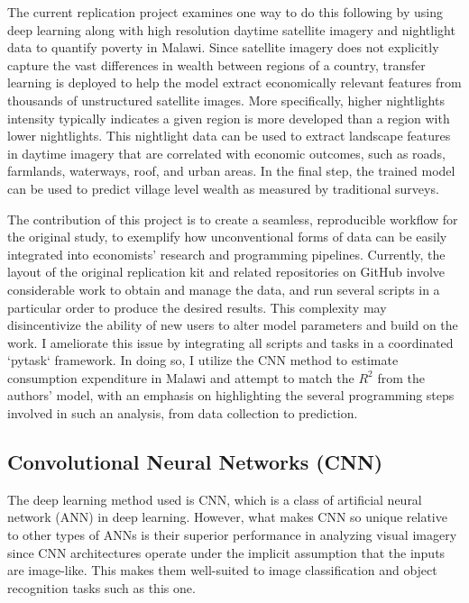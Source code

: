 \documentclass[11pt, a4paper, leqno]{article}
\begin{document}
The current replication project examines one way to do this following \citet{jean2016combining} by using deep learning along with high resolution daytime satellite imagery and nightlight data to quantify poverty in Malawi. Since satellite imagery does not explicitly capture the vast differences in wealth between regions of a country, transfer learning is deployed to help the model extract economically relevant features from thousands of unstructured satellite images. More specifically, higher nightlights intensity typically indicates a given region is more developed than a region with lower nightlights. This nightlight data can be used to extract landscape features in daytime imagery that are correlated with economic outcomes, such as roads, farmlands, waterways, roof, and urban areas. In the final step, the trained model can be used to predict village level wealth as measured by traditional surveys. 

The contribution of this project is to create a seamless, reproducible workflow for the original study, to exemplify how unconventional forms of data can be easily integrated into economists' research and programming pipelines. Currently, the layout of the original replication kit and related repositories on GitHub involve considerable work to obtain and manage the data, and run several scripts in a particular order to produce the desired results. This complexity may disincentivize the ability of new users to alter model parameters and build on the work. I ameliorate this issue by integrating all scripts and tasks in a coordinated `pytask` framework. In doing so, I utilize the CNN method to estimate consumption expenditure in Malawi and attempt to match the $R^2$ from the authors' model, with an emphasis on highlighting the several programming steps involved in such an analysis, from data collection to prediction. 

\subsection{Convolutional Neural Networks (CNN)}

The deep learning method used is CNN, which is a class of artificial neural network (ANN) in deep learning. However, what makes CNN so unique relative to other types of ANNs is their superior performance in analyzing visual imagery since CNN architectures operate under the implicit assumption that the inputs are image-like. This makes them well-suited to image classification and object recognition tasks such as this one.
\end{document}

